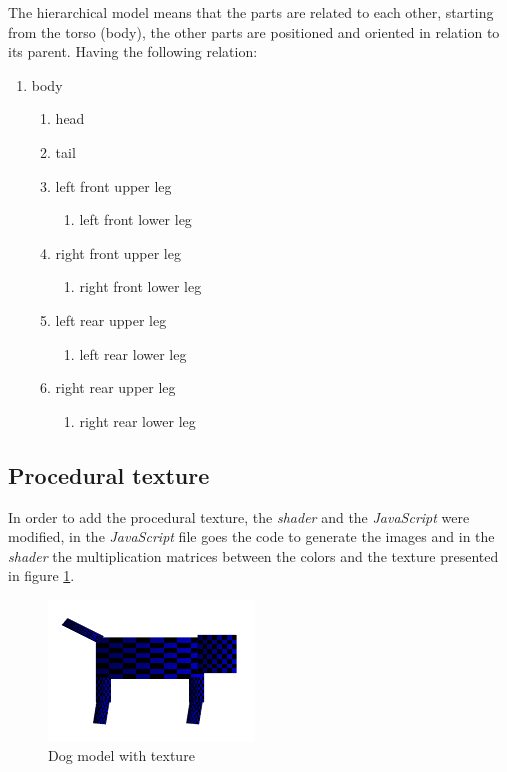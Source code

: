 \documentclass{article}
\begin{document}
The hierarchical model means that the parts are related to each other, starting from the torso (body), the other parts are positioned and oriented in relation to its parent. Having the following relation:

\begin{enumerate}
\item body
\begin{enumerate}
\item head
\item tail
\item left front upper leg
\begin{enumerate}
\item left front lower leg
\end{enumerate}
\item right front upper leg
\begin{enumerate}
\item right front lower leg
\end{enumerate}
\item left rear upper leg
\begin{enumerate}
\item left rear lower leg
\end{enumerate}
\item right rear upper leg
\begin{enumerate}
\item right rear lower leg
\end{enumerate}
\end{enumerate}
\end{enumerate}

\subsection {Procedural texture}
In order to add the procedural texture, the \textit{shader} and the \textit{JavaScript} were modified, in the \textit{JavaScript} file goes the code to generate the images and in the \textit{shader} the multiplication matrices between the colors and the texture presented in figure \ref{fig:fig2}.

\begin{figure}[!ht]
\centering
\includegraphics[scale=1]{texture}
\caption{Dog model with texture}
\label{fig:fig2}
\end{figure}
\end{document}
